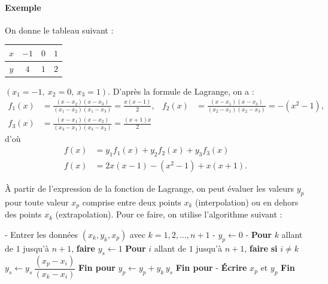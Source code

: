 \paragraph{Exemple} On donne le tableau suivant :
\begin{center}
  \begin{tabular}{|c|c|c|c|}
    \hline
    $x$ & $-1$ & $0$ & $1$\\ \hline
    $y$ & $4$ & $1$ & $2$\\ \hline
  \end{tabular}
\end{center}
$(x_1 = -1,\ x_2 = 0,\ x_3 = 1)$. D'après la formule de Lagrange, on a :
\[
  \begin{aligned}
    f_1(x) &= \frac{(x - x_2)(x - x_3)}{(x_1 - x_2)(x_1 - x_3)} = \frac{x(x-1)}{2}, &
    f_2(x) &= \frac{(x - x_1)(x - x_3)}{(x_2 - x_1)(x_2 - x_3)} = -(x^2 - 1),\\
    f_3(x) &= \frac{(x - x_1)(x - x_2)}{(x_3 - x_1)(x_3 - x_2)} = \frac{(x+1)x}{2}
  \end{aligned}
\]
d'où
\[
  \begin{aligned}
    f(x) &= y_1f_1(x) + y_2f_2(x) + y_3f_3(x)\\
    f(x) &= 2x(x-1) - (x^2 - 1) + x(x+1).
  \end{aligned}
\]

À partir de l'expression de la fonction de Lagrange, on peut évaluer les
valeurs $y_p$ pour toute valeur $x_p$ comprise entre deux points $x_k$
(interpolation) ou en dehors des points $x_k$ (extrapolation). Pour ce faire,
on utilise l'algorithme suivant :

\begin{algo}
  - Entrer les données $(x_k, y_k, x_p)$ avec $k = 1, 2, \dots, n+1$
  - $y_p \leftarrow 0$
  - \textbf{Pour} $k$ allant de $1$ jusqu'à $n+1$, \textbf{faire}
  \State \hspace{2.2em} $y_s \leftarrow 1$
  \State \hspace{2.2em} \textbf{Pour} $i$ allant de $1$ jusqu'à $n+1$, \textbf{faire}
  \State \hspace{4.4em} \textbf{si} $i \neq k$
  \State \hspace{5.5em} $y_s \leftarrow y_s\,\dfrac{(x_p - x_i)}{(x_k - x_i)}$
  \State \hspace{2.2em} \textbf{Fin pour}
  \State \hspace{2.2em} $y_p \leftarrow y_p + y_k\,y_s$
  \State \hspace{1em} \textbf{Fin pour}
  - \textbf{Écrire} $x_p$ et $y_p$
  \State \textbf{Fin}
\end{algo}

